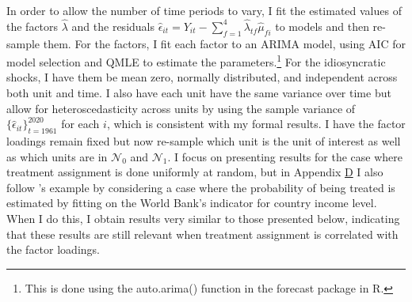 \documentclass{article}
\begin{document}
In order to allow the number of time periods to vary, I fit the estimated values of the factors $\hat{\lambda}$ and the residuals $\hat{\epsilon}_{it} = Y_{it} - \sum_{f =1}^4 \hat{\lambda}_{tf}\hat{\mu}_{fi}$ to models and then re-sample them. For the factors, I fit each factor to an ARIMA model, using AIC for model selection and QMLE to estimate the parameters.\footnote{This is done using the auto.arima() function in the forecast package in R.} For the idiosyncratic shocks, I have them be mean zero, normally distributed, and independent across both unit and time. I also have each unit have the same variance over time but allow for heteroscedasticity across units by using the sample variance of $\{\hat{\epsilon}_{it}\}_{t=1961}^{2020}$ for each $i$, which is consistent with my formal results. I have the factor loadings remain fixed but now re-sample which unit is the unit of interest as well as which units are in $\mathcal{N}_0$ and $\mathcal{N}_1$. I focus on presenting results for the case where treatment assignment is done uniformly at random, but in Appendix \hyperref[ApD]{D} I also follow \cite{SDID}'s example by considering a case where the probability of being treated is estimated by fitting on the World Bank's indicator for country income level. When I do this, I obtain results very similar to those presented below, indicating that these results are still relevant when treatment assignment is correlated with the factor loadings. 
\par 
\end{document}
